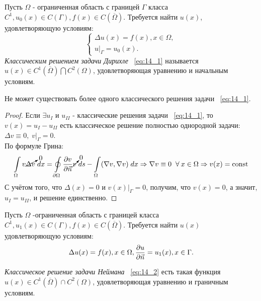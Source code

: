 \documentclass[../main.tex]{subfiles}
\begin{document}
Пусть $\Omega$ - ограниченная область с границей $\Gamma$ класса $C^1, u_0(x) \in C(\Gamma), f(x) \in C(\overline{\Omega})$. Требуется найти $u(x)$, удовлетворяющую условиям:
\begin{equation}
\label{eq:14_1}
	\begin{cases}
		\Delta u(x) = f(x), x \in \Omega, \\
		u\bigr|_{\Gamma} = u_0(x).
	\end{cases}
\end{equation}
\textit{Классическим решением задачи Дирихле} ~\ref{eq:14_1} называется $u(x) \in C^1(\overline{\Omega}) \bigcap C^2({\Omega})$, удовлетворяющая уравнению и начальным условиям. \\
\begin{lemma}
Не может существовать более одного классического решения задачи ~\ref{eq:14_1}.
\end{lemma}
\begin{proof}
Если $\exists u_{I}$ и $u_{II}$ - классические решения задачи ~\ref{eq:14_1}, то $v(x) = u_{I} - u_{II}$ есть классическое решение полностью однородной задачи: $\Delta v \equiv 0,\; v\bigr|_{\Gamma} = 0$. \\
По формуле Грина:
\begin{equation*}
	\int\limits_{\Omega} v\cancelto{0}{\Delta v}\; dx = \oint\limits_{\partial \Omega}\dfrac{\partial v}{\partial \vec{n}}\cancelto{0}{v}\;ds - \int\limits_{\Omega}(\nabla v, \nabla v)\;dx \Rightarrow \nabla v \equiv 0 \;\;\forall\: x \in \Omega \Rightarrow v(x) = \text{const}
\end{equation*}
С учётом того, что $\Delta(x) = 0$ и $v(x)\bigr|_{\Gamma} = 0$, получим, что $v(x) = 0$, а значит, $u_{I} = u_{II}$, и решение единственно.
\end{proof}
Пусть $\Omega$ -ограниченная область с границей класса $C^1, u_1(x) \in C(\Gamma), f(x) \in C(\overline{\Omega})$. Требуется найти $u(x)$ удовлетворяющую условиям:
\begin{equation}
\label{eq:14_2}
	\Delta u(x) = f(x), x \in \Omega, \\
	\dfrac{\partial u}{\partial \vec{n}} = u_1(x), x \in \Gamma.
\end{equation}
\begin{definition}
\textit{Классическое решение задачи Неймана} ~\ref{eq:14_2} есть такая функция $u(x) \in C^1(\overline{\Omega}) \cap C^2({\Omega})$, удовлетворяющая уравнению и граничным условиям.
\end{definition}
\end{document}
